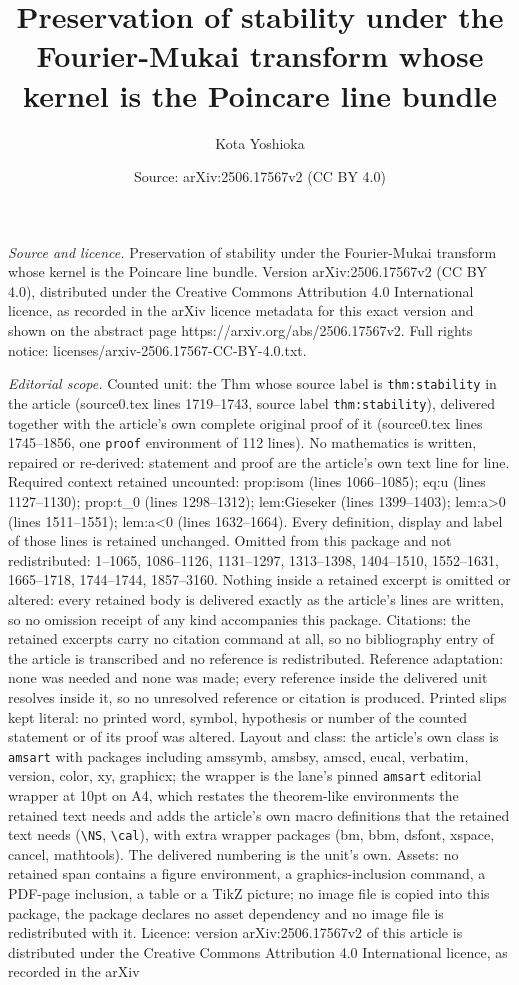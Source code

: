 \documentclass[10pt,a4paper]{amsart}
\title[Preservation of stability under the Fourier-Mukai transform ]{Preservation of stability under the Fourier-Mukai transform whose kernel is the Poincare line bundle}
\author{Kota Yoshioka}
\date{Source: arXiv:2506.17567v2 (CC BY 4.0)}
\begin{document}
\maketitle

\noindent\emph{Source and licence.} Preservation of stability under the Fourier-Mukai transform whose kernel is the Poincare line bundle. Version arXiv:2506.17567v2 (CC BY 4.0), distributed under the Creative Commons Attribution 4.0 International licence, as recorded in the arXiv licence metadata for this exact version and shown on the abstract page https://arxiv.org/abs/2506.17567v2. Full rights notice: licenses/arxiv-2506.17567-CC-BY-4.0.txt.\par\smallskip

\noindent\textit{Editorial scope.} Counted unit: the Thm whose source label is \texttt{thm:stability} in the article (source0.tex lines 1719--1743, source label \texttt{thm:stability}), delivered together with the article's own complete original proof of it (source0.tex lines 1745--1856, one \texttt{proof} environment of 112 lines). No mathematics is written, repaired or re-derived: statement and proof are the article's own text line for line. Required context retained uncounted: prop:isom (lines 1066--1085); eq:u (lines 1127--1130); prop:t\_0 (lines 1298--1312); lem:Gieseker (lines 1399--1403); lem:a>0 (lines 1511--1551); lem:a<0 (lines 1632--1664). Every definition, display and label of those lines is retained unchanged. Omitted from this package and not redistributed: 1--1065, 1086--1126, 1131--1297, 1313--1398, 1404--1510, 1552--1631, 1665--1718, 1744--1744, 1857--3160. Nothing inside a retained excerpt is omitted or altered: every retained body is delivered exactly as the article's lines are written, so no omission receipt of any kind accompanies this package. Citations: the retained excerpts carry no citation command at all, so no bibliography entry of the article is transcribed and no reference is redistributed. Reference adaptation: none was needed and none was made; every reference inside the delivered unit resolves inside it, so no unresolved reference or citation is produced. Printed slips kept literal: no printed word, symbol, hypothesis or number of the counted statement or of its proof was altered. Layout and class: the article's own class is \texttt{amsart} with packages including amssymb, amsbsy, amscd, eucal, verbatim, version, color, xy, graphicx; the wrapper is the lane's pinned \texttt{amsart} editorial wrapper at 10pt on A4, which restates the theorem-like environments the retained text needs and adds the article's own macro definitions that the retained text needs (\texttt{\textbackslash NS}, \texttt{\textbackslash cal}), with extra wrapper packages (bm, bbm, dsfont, xspace, cancel, mathtools). The delivered numbering is the unit's own. Assets: no retained span contains a figure environment, a graphics-inclusion command, a PDF-page inclusion, a table or a TikZ picture; no image file is copied into this package, the package declares no asset dependency and no image file is redistributed with it. Licence: version arXiv:2506.17567v2 of this article is distributed under the Creative Commons Attribution 4.0 International licence, as recorded in the arXiv 
\end{document}
